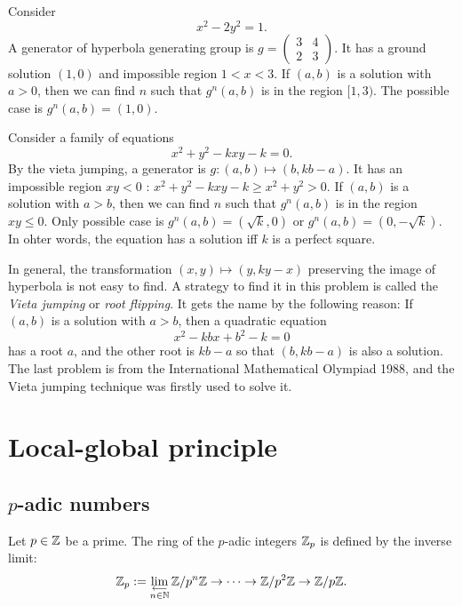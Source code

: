 \documentclass{../../large}
\begin{document}
\begin{ex}
Consider\[x^2-2y^2=1.\]
A generator of hyperbola generating group is $g=\begin{pmatrix}3&4\\2&3\end{pmatrix}$.
It has a ground solution $(1,0)$ and impossible region $1<x<3$.
If $(a,b)$ is a solution with $a>0$, then we can find $n$ such that $g^n(a,b)$ is in the region $[1,3)$.
The possible case is $g^n(a,b)=(1,0)$.
\end{ex}
\begin{ex}
Consider a family of equations\[x^2+y^2-kxy-k=0.\]
By the vieta jumping, a generator is $g:(a,b)\mapsto(b,kb-a)$.
It has an impossible region $xy<0$ : $x^2+y^2-kxy-k\ge x^2+y^2>0$.
If $(a,b)$ is a solution with $a>b$, then we can find $n$ such that $g^n(a,b)$ is in the region $xy\le0$.
Only possible case is $g^n(a,b)=(\sqrt k,0)$ or $g^n(a,b)=(0,-\sqrt k)$.
In ohter words, the equation has a solution iff $k$ is a perfect square.

In general, the transformation $(x,y)\mapsto(y,ky-x)$ preserving the image of hyperbola is not easy to find.
A strategy to find it in this problem is called the \emph{Vieta jumping} or \emph{root flipping}.
It gets the name by the following reason:
If $(a,b)$ is a solution with $a>b$, then a quadratic equation \[x^2-kbx+b^2-k=0\] has a root $a$, and the other root is $kb-a$ so that $(b,kb-a)$ is also a solution.
The last problem is from the International Mathematical Olympiad 1988, and the Vieta jumping technique was firstly used to solve it.
\end{ex}








\chapter{Local-global principle}

\section{$p$-adic numbers}

Let $p\in\mathbb{Z}$ be a prime.
The ring of the $p$-adic integers $\mathbb{Z}_p$ is defined by the inverse limit:
\[
\mathbb{Z}_p:=\lim\limits_{\substack{\longleftarrow\\n\in\mathbb{N}}}\mathbb{Z}/p^n\mathbb{Z}\to\cdots\to\mathbb{Z}/p^2\mathbb{Z}\to\mathbb{Z}/p\mathbb{Z}.
\]
\end{document}
